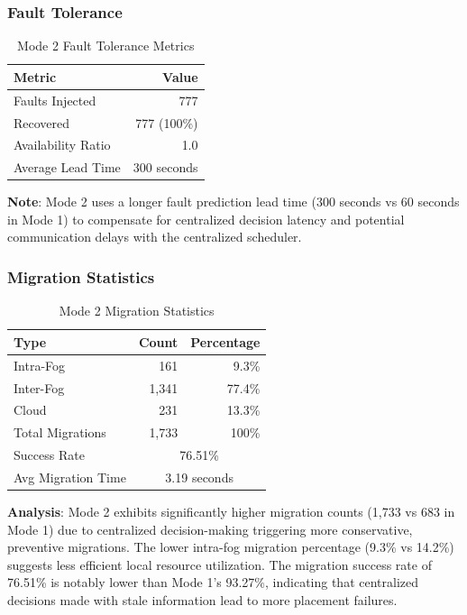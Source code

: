 \documentclass[12pt,a4paper]{article}
\begin{document}
\subsubsection{Fault Tolerance}

\begin{table}[h]
\centering
\begin{tabular}{@{}lr@{}}
\toprule
\textbf{Metric} & \textbf{Value} \\ \midrule
Faults Injected & 777 \\
Recovered & 777 (100\%) \\
Availability Ratio & 1.0 \\
Average Lead Time & 300 seconds \\ \bottomrule
\end{tabular}
\caption{Mode 2 Fault Tolerance Metrics}
\label{tab:mode2-faults}
\end{table}

\textbf{Note}: Mode 2 uses a longer fault prediction lead time (300 seconds vs 60 seconds in Mode 1) to compensate for centralized decision latency and potential communication delays with the centralized scheduler.

\subsubsection{Migration Statistics}

\begin{table}[h]
\centering
\begin{tabular}{@{}lrr@{}}
\toprule
\textbf{Type} & \textbf{Count} & \textbf{Percentage} \\ \midrule
Intra-Fog & 161 & 9.3\% \\
Inter-Fog & 1,341 & 77.4\% \\
Cloud & 231 & 13.3\% \\
\midrule
Total Migrations & 1,733 & 100\% \\ \midrule
Success Rate & \multicolumn{2}{c}{76.51\%} \\
Avg Migration Time & \multicolumn{2}{c}{3.19 seconds} \\ \bottomrule
\end{tabular}
\caption{Mode 2 Migration Statistics}
\label{tab:mode2-migrations}
\end{table}

\textbf{Analysis}: Mode 2 exhibits significantly higher migration counts (1,733 vs 683 in Mode 1) due to centralized decision-making triggering more conservative, preventive migrations. The lower intra-fog migration percentage (9.3\% vs 14.2\%) suggests less efficient local resource utilization. The migration success rate of 76.51\% is notably lower than Mode 1's 93.27\%, indicating that centralized decisions made with stale information lead to more placement failures.
\end{document}
